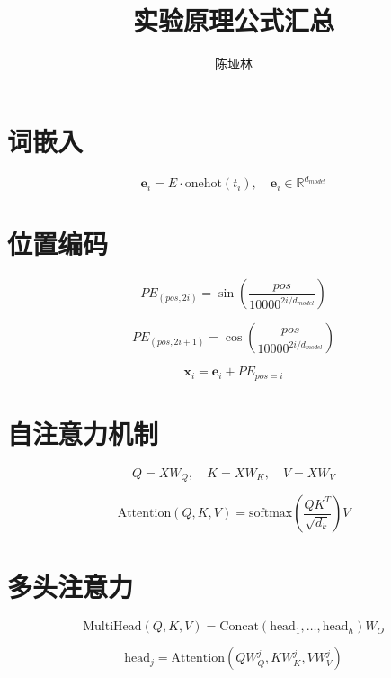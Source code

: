 \documentclass[12pt, a4paper]{article}
\title{实验原理公式汇总}
\author{陈垭林}
\date{}
\begin{document}
\maketitle

\section{词嵌入}
\begin{equation}
    \mathbf{e}_i = E \cdot \text{onehot}(t_i), \quad \mathbf{e}_i \in \mathbb{R}^{d_{model}}
\end{equation}

\section{位置编码}
\begin{equation}
    PE_{(pos, 2i)} = \sin\left(\frac{pos}{10000^{2i/d_{model}}}\right)
\end{equation}

\begin{equation}
    PE_{(pos, 2i+1)} = \cos\left(\frac{pos}{10000^{2i/d_{model}}}\right)
\end{equation}

\begin{equation}
    \mathbf{x}_i = \mathbf{e}_i + PE_{pos=i}
\end{equation}

\section{自注意力机制}
\begin{equation}
    Q = XW_Q, \quad K = XW_K, \quad V = XW_V
\end{equation}

\begin{equation}
    \text{Attention}(Q, K, V) = \text{softmax}\left(\frac{QK^T}{\sqrt{d_k}}\right)V
\end{equation}

\section{多头注意力}
\begin{equation}
    \text{MultiHead}(Q,K,V) = \text{Concat}(\text{head}_1, \dots, \text{head}_h)W_O
\end{equation}

\begin{equation}
    \text{head}_j = \text{Attention}(QW_Q^j, KW_K^j, VW_V^j)
\end{equation}
\end{document}
